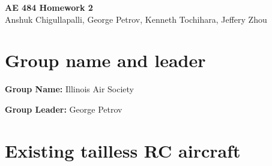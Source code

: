 




\begin{center}
    {\Large\textbf{AE 484 Homework 2}}\\
    Anshuk Chigullapalli, George Petrov, Kenneth Tochihara, Jeffery Zhou\\
\end{center}


\section{Group name and leader}

    \textbf{Group Name:} Illinois Air Society %
    
    \textbf{Group Leader:} George Petrov %

\section{Existing tailless RC aircraft}

